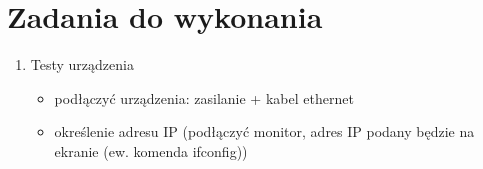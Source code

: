 \documentclass[a4paper,12pt]{extarticle}  %
\begin{document}
\section{Zadania do wykonania}
\begin{enumerate}
    \item Testy urządzenia
    \begin{itemize}
        \item podłączyć urządzenia: zasilanie + kabel ethernet
        \begin{figure}[H]
           \centering
        \end{figure}
        \item określenie adresu IP (podłączyć monitor, adres IP podany będzie na ekranie (ew. komenda ifconfig))
        \begin{figure}[H]

\end{figure}
\end{itemize}
\end{enumerate}
\end{document}
